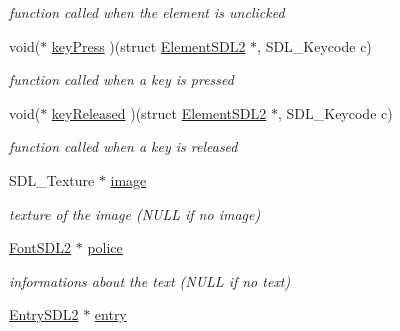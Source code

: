 \begin{DoxyCompactItemize}
\begin{DoxyCompactList}\small\item\em function called when the element is unclicked \end{DoxyCompactList}\item 
void($\ast$ \hyperlink{structElementSDL2_aff1dc935700d44a0ef0d53de7cca9d41}{key\+Press} )(struct \hyperlink{structElementSDL2}{Element\+S\+D\+L2} $\ast$, S\+D\+L\+\_\+\+Keycode c)\hypertarget{structElementSDL2_aff1dc935700d44a0ef0d53de7cca9d41}{}\label{structElementSDL2_aff1dc935700d44a0ef0d53de7cca9d41}

\begin{DoxyCompactList}\small\item\em function called when a key is pressed \end{DoxyCompactList}\item 
void($\ast$ \hyperlink{structElementSDL2_a76ecf85adcb072db772a8351ea7e04ee}{key\+Released} )(struct \hyperlink{structElementSDL2}{Element\+S\+D\+L2} $\ast$, S\+D\+L\+\_\+\+Keycode c)\hypertarget{structElementSDL2_a76ecf85adcb072db772a8351ea7e04ee}{}\label{structElementSDL2_a76ecf85adcb072db772a8351ea7e04ee}

\begin{DoxyCompactList}\small\item\em function called when a key is released \end{DoxyCompactList}\item 
S\+D\+L\+\_\+\+Texture $\ast$ \hyperlink{structElementSDL2_aab2ff0fd3a1c4370d7f1f9cdd250d056}{image}\hypertarget{structElementSDL2_aab2ff0fd3a1c4370d7f1f9cdd250d056}{}\label{structElementSDL2_aab2ff0fd3a1c4370d7f1f9cdd250d056}

\begin{DoxyCompactList}\small\item\em texture of the image (N\+U\+LL if no image) \end{DoxyCompactList}\item 
\hyperlink{structFontSDL2}{Font\+S\+D\+L2} $\ast$ \hyperlink{structElementSDL2_a785d4fada0ba0ac6b5ce7a53c379f8cd}{police}\hypertarget{structElementSDL2_a785d4fada0ba0ac6b5ce7a53c379f8cd}{}\label{structElementSDL2_a785d4fada0ba0ac6b5ce7a53c379f8cd}

\begin{DoxyCompactList}\small\item\em informations about the text (N\+U\+LL if no text) \end{DoxyCompactList}\item 
\hyperlink{structEntrySDL2}{Entry\+S\+D\+L2} $\ast$ \hyperlink{structElementSDL2_a9c99c1c34dcf0e52baaca7a64598bd8a}{entry}\hypertarget{structElementSDL2_a9c99c1c34dcf0e52baaca7a64598bd8a}{}\label{structElementSDL2_a9c99c1c34dcf0e52baaca7a64598bd8a}


\end{DoxyCompactItemize}
